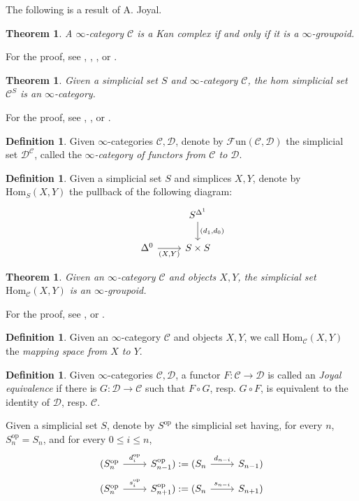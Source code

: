 \documentclass[a4paper]{book}
\newcommand{\lC}{\mathcal{C}}
\newcommand{\lD}{\mathcal{D}}
\newcommand{\lF}{\mathcal{F}}
\newcommand{\op}{\mathrm{op}}
\newcommand{\Fun}{\lF\mathrm{un}} %
\renewcommand{\hom}{\mathrm{Hom}} %
\newtheorem{theorem}[equation]{Theorem}
\theoremstyle{definition}
\newtheorem{definition}[equation]{Definition}
\theoremstyle{remark}
\numberwithin{equation}{section}
\begin{document}
The following is a result of A. Joyal.
\begin{theorem} A $\infty$-category $\lC$ is a Kan complex if and only if it is a $\infty$-groupoid. 
\end{theorem}
For the proof, see \cite[Corollary 1.4]{joyal2002quasicatkancomplexes}, \cite[Tag 019D]{kerodon2026}, \cite[Proposition 1.2.5.1]{lurie2009htt}, or \cite[Corollary 2.1.12]{land2021introduction}.
\begin{theorem}
	Given a simplicial set $S$ and $\infty$-category $\lC$, the hom simplicial set $\lC^S$ is an $\infty$-category. 
\end{theorem}
For the proof, see \cite[Corollary 1.3.38]{land2021introduction}, \cite[Tag 0066]{kerodon2026}, or \cite[Corollary 2.3.2.5]{lurie2009htt}.
\begin{definition}
	Given $\infty$-categories $\lC,\lD$, denote by $\Fun(\lC,\lD)$ the simplicial set $\lD^\lC$, called the \emph{$\infty$-category of functors from $\lC$ to $\lD$}.  
\end{definition}
\begin{definition}
	Given a simplicial set $S$ and simplices $X,Y$, denote by $\hom_S(X,Y)$ the pullback of the following diagram: \begin{equation}
		\begin{tikzcd}
			& S^{\Delta^1} \arrow[d,"{(d_1,d_0)}"]\\
			\Delta^0 \arrow[r,"{(X,Y)}"'] & S\times S
		\end{tikzcd}
	\end{equation}
\end{definition}
\begin{theorem}
	Given an $\infty$-category $\lC$ and objects $X,Y$, the simplicial set $\hom_\lC(X,Y)$ is an $\infty$-groupoid.
\end{theorem}
For the proof, see \cite[Corollary 2.2.4]{land2021introduction}, or \cite[Tag 01P1]{kerodon2026}. 
\begin{definition}
	Given an $\infty$-category $\lC$ and objects $X,Y$, we call $\hom_\lC(X,Y)$ the \emph{mapping space from $X$ to $Y$}.
\end{definition}
\begin{definition}
	Given $\infty$-categories $\lC,\lD$, a functor $F:\lC\to\lD$ is called an \emph{Joyal equivalence} if there is $G:\lD\to\lC$ such that $F\circ G$, resp. $G\circ F$, is equivalent to the identity of $\lD$, resp. $\lC$. 
\end{definition}
Given a simplicial set $S$, denote by $S^\op$ the simplicial set having, for every $n$, $S^\op_n=S_n$, and for every $0\leq i\leq n$, \begin{equation}
		\begin{tikzcd}[row sep=0.25cm]
		(S^\op_n \arrow[r,"d_i^\op"] &  S^\op_{n-1}):=(S_n\arrow[r,"d_{n-i}"] &  S_{n-1})\\
		(S^\op_n \arrow[r,"s_i^\op"] &  S^\op_{n+1}):=(S_n\arrow[r,"s_{n-i}"] &  S_{n+1})
		\end{tikzcd}
	\end{equation}
\end{document}
